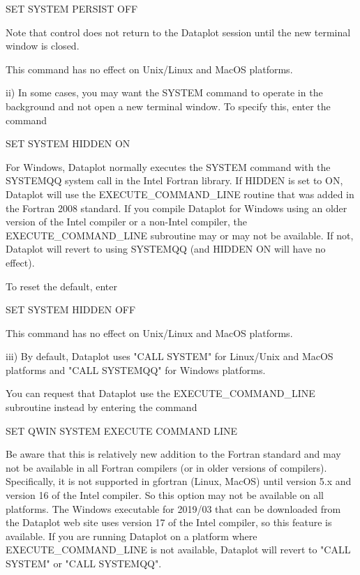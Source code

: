               SET SYSTEM PERSIST OFF

         Note that control does not return to the Dataplot session
         until the new terminal window is closed.

         This command has no effect on Unix/Linux and MacOS platforms.

     ii) In some cases, you may want the SYSTEM command to operate in
         the background and not open a new terminal window.  To specify
         this, enter the command

              SET SYSTEM HIDDEN ON

         For Windows, Dataplot normally executes the SYSTEM command with
         the SYSTEMQQ system call in the Intel Fortran library.  If
         HIDDEN is set to ON, Dataplot will use the EXECUTE_COMMAND_LINE
         routine that was added in the Fortran 2008 standard.  If you
         compile Dataplot for Windows using an older version of the Intel
         compiler or a non-Intel compiler, the EXECUTE_COMMAND_LINE
         subroutine may or may not be available.  If not, Dataplot will
         revert to using SYSTEMQQ (and HIDDEN ON will have no effect).

         To reset the default, enter

              SET SYSTEM HIDDEN OFF

         This command has no effect on Unix/Linux and MacOS platforms.

    iii) By default, Dataplot uses "CALL SYSTEM" for Linux/Unix and
         MacOS platforms and "CALL SYSTEMQQ" for Windows platforms.

         You can request that Dataplot use the EXECUTE_COMMAND_LINE
         subroutine instead by entering the command

              SET QWIN SYSTEM EXECUTE COMMAND LINE

         Be aware that this is relatively new addition to the Fortran
         standard and may not be available in all Fortran compilers (or
         in older versions of compilers).  Specifically, it is not
         supported in gfortran (Linux, MacOS) until version 5.x and
         version 16 of the Intel compiler.  So this option may not be
         available on all platforms.  The Windows executable for 2019/03
         that can be downloaded from the Dataplot web site uses version 17
         of the Intel compiler, so this feature is available.  If you are
         running Dataplot on a platform where EXECUTE_COMMAND_LINE is not
         available, Dataplot will revert to "CALL SYSTEM" or
         "CALL SYSTEMQQ".

